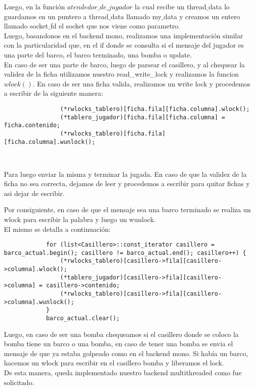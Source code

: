 Luego, en la función $atendedor\_de\_jugador$ la cual recibe un thread$\_$data lo guardamos en un puntero a thread$\_$data llamado
my$\_$data y creamos un entero llamado socket$\_$fd el socket que nos viene como parametro.\\

Luego, basandonos en el backend mono, realizamos una implementación similar con la particularidad que, en el if donde se
consulta si el mensaje del jugador es una parte del barco, el barco terminado, una bomba o update.\\
En caso de ser una parte de barco, luego de parsear el casillero, y al chequear la validez de la ficha utilizamos nuestro read\_write\_lock y realizamos
la funcion $wlock()$. En caso de ser una ficha valida, realizamos un write lock y procedemos a escribir de la siguiente manera:\\
\begin{verbatim}
				(*rwlocks_tablero)[ficha.fila][ficha.columna].wlock();
				(*tablero_jugador)[ficha.fila][ficha.columna] = ficha.contenido;
				(*rwlocks_tablero)[ficha.fila][ficha.columna].wunlock();
                     
                     
\end{verbatim}
Para luego enviar la misma y terminar la jugada. En caso de que la validez de la ficha no sea correcta, dejamos de leer
y procedemos a escribir para quitar fichas y asi dejar de escribir.

Por consiguiente, en caso de que el mensaje sea una barco terminado se realiza un wlock para escribir la palabra y luego un wunlock.\\

El mismo se detalla a continuación:\\
\begin{verbatim}
			for (list<Casillero>::const_iterator casillero = barco_actual.begin(); casillero != barco_actual.end(); casillero++) {
				(*rwlocks_tablero)[casillero->fila][casillero->columna].wlock();
				(*tablero_jugador)[casillero->fila][casillero->columna] = casillero->contenido;
				(*rwlocks_tablero)[casillero->fila][casillero->columna].wunlock();
			}
			barco_actual.clear();       
\end{verbatim}

Luego, en caso de ser una bomba chequeamos si el casillero donde se coloco la bomba tiene un barco o una bomba, en caso de tener una bomba se envia el mensaje de que ya estaba golpeado como en el backend mono. Si había un barco, hacemos un wlock para escribir en el casillero bomba y liberamos el lock.\\

De esta manera, queda implementado nuestro backend multithreaded como fue solicitado.






